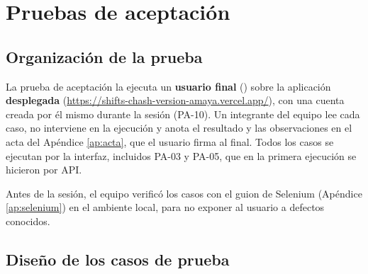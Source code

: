 \section{Pruebas de aceptación}

\subsection{Organización de la prueba}

La prueba de aceptación la ejecuta un \textbf{usuario final} (\resUsuarioFinal) sobre la aplicación \textbf{desplegada} (\url{https://shifts-chash-version-amaya.vercel.app/}), con una cuenta creada por él mismo durante la sesión (PA-10). Un integrante del equipo lee cada caso, no interviene en la ejecución y anota el resultado y las observaciones en el acta del Apéndice \ref{ap:acta}, que el usuario firma al final. Todos los casos se ejecutan por la interfaz, incluidos PA-03 y PA-05, que en la primera ejecución se hicieron por API.

Antes de la sesión, el equipo verificó los casos con el guion de Selenium (Apéndice \ref{ap:selenium}) en el ambiente local, para no exponer al usuario a defectos conocidos.

\subsection{Diseño de los casos de prueba}

